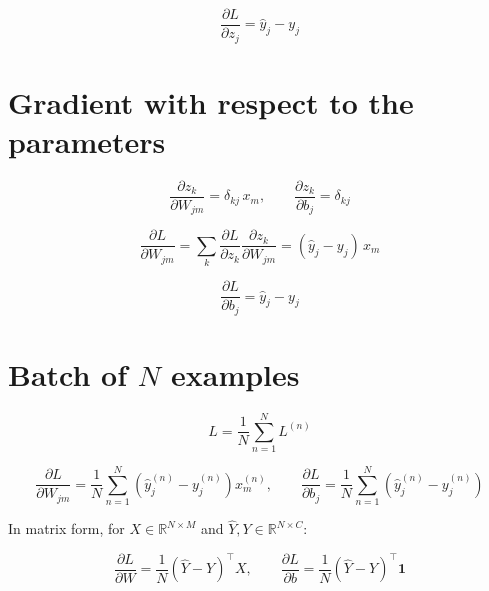 \documentclass[11pt]{article}
\begin{document}
\[
\boxed{\frac{\partial L}{\partial z_j} = \hat{y}_j - y_j}
\]

\section*{Gradient with respect to the parameters}

\[
\frac{\partial z_k}{\partial W_{jm}} = \delta_{kj}\,x_m, \qquad
\frac{\partial z_k}{\partial b_j} = \delta_{kj}
\]

\[
\frac{\partial L}{\partial W_{jm}}
= \sum_k \frac{\partial L}{\partial z_k}\frac{\partial z_k}{\partial W_{jm}}
= (\hat{y}_j - y_j)\,x_m
\]

\[
\frac{\partial L}{\partial b_j} = \hat{y}_j - y_j
\]

\section*{Batch of $N$ examples}

\[
L = \frac{1}{N}\sum_{n=1}^{N} L^{(n)}
\]

\[
\frac{\partial L}{\partial W_{jm}}
= \frac{1}{N}\sum_{n=1}^{N}\left(\hat{y}_j^{(n)} - y_j^{(n)}\right)x_m^{(n)},
\qquad
\frac{\partial L}{\partial b_j}
= \frac{1}{N}\sum_{n=1}^{N}\left(\hat{y}_j^{(n)} - y_j^{(n)}\right)
\]

In matrix form, for $X \in \mathbb{R}^{N\times M}$ and $\hat{Y}, Y \in \mathbb{R}^{N\times C}$:

\[
\frac{\partial L}{\partial W} = \frac{1}{N}(\hat{Y} - Y)^{\top}X, \qquad
\frac{\partial L}{\partial b} = \frac{1}{N}(\hat{Y} - Y)^{\top}\mathbf{1}
\]
\end{document}
